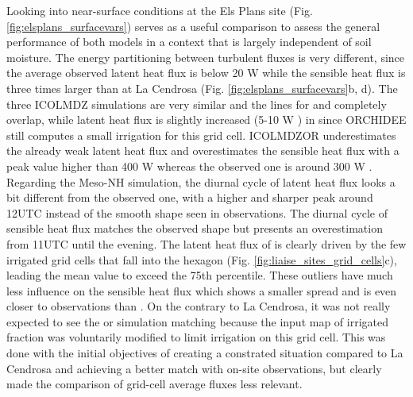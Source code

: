 Looking into near-surface conditions at the Els Plans site (Fig. \ref{fig:elsplans_surfacevars}) serves as a useful comparison to assess the general performance of both models in a context that is largely independent of soil moisture.
The energy partitioning between turbulent fluxes is very different, since the average observed latent heat flux is below 20 W \persqm while the sensible heat flux is three times larger than at La Cendrosa (Fig. \ref{fig:elsplans_surfacevars}b, d). 
The three ICOLMDZ simulations are very similar and the lines for \noirr and \irr completely overlap, while latent heat flux is slightly increased (5-10 W \persqm) in \irrboost since ORCHIDEE still computes a small irrigation for this grid cell. 
ICOLMDZOR underestimates the already weak latent heat flux and overestimates the sensible heat flux with a peak value higher than 400 W \persqm whereas the observed one is around 300 W \persqm. 
Regarding the Meso-NH simulation, the \mesoexact diurnal cycle of latent heat flux looks a bit different from the observed one, with a higher and sharper peak around 12UTC instead of the smooth shape seen in observations. The diurnal cycle of sensible heat flux matches the observed shape but presents an overestimation from 11UTC until the evening.
The latent heat flux of \mesomean is clearly driven by the few irrigated grid cells that fall into the hexagon (Fig. \ref{fig:liaise_sites_grid_cells}c), leading the mean value to exceed the 75th percentile. These outliers have much less influence on the sensible heat flux which shows a smaller spread and is even closer to observations than \mesoexact.
On the contrary to La Cendrosa, it was not really expected to see the \irr or \irrboost simulation matching \mesomean because the input map of irrigated fraction was voluntarily modified to limit irrigation on this grid cell. This was done with the initial objectives of creating a constrated situation compared to La Cendrosa and achieving a better match with on-site observations, but clearly made the comparison of grid-cell average fluxes less relevant.

